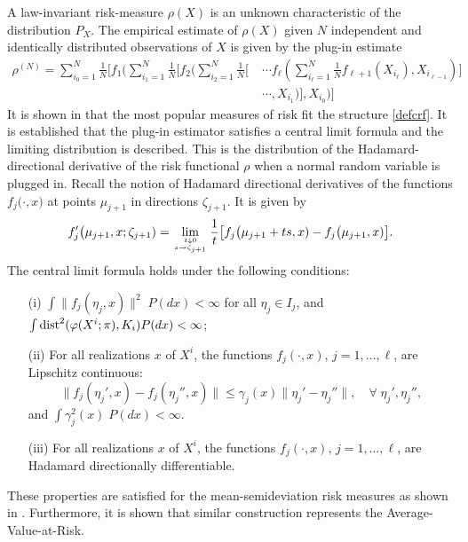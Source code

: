 \documentclass[10pt,letterpaper]{article}
\newcommand{\1}{1{\hskip -2.55 pt}\hbox{I}}
\newcommand{\dist}{\mathop{\rm dist}}
\begin{document}
A law-invariant risk-measure $\rho(X)$ is an unknown characteristic of the distribution $P_{X}$. The empirical estimate of $\rho(X)$ given $N$ independent and identically distributed observations of $X$ is given by the plug-in estimate
\begin{equation}\label{defcrfa} 
 \begin{aligned}
\rho^{(N)} = \sum_{i_0=1}^N\frac{1}{N}\Big[f_1\Big(\sum_{i_1=1}^N\frac{1}{N}\big[f_2\big(\sum_{i_2=1}^N\frac{1}{N}[&\;\cdots f_\ell(\sum_{i_\ell=1}^N\frac{1}{N}f_{\ell+1}(X_{i_\ell}),X_{i_{\ell-1}})]\\
&\;\cdots,X_{i_1}\big)\big],X_{i_0}\Big)\Big]
\end{aligned}
\end{equation}
 It is shown in \cite{dentcheva2016statistical} that the most popular measures of risk fit the structure \eqref{defcrf}. It is established that the plug-in estimator satisfies a central limit formula and the limiting distribution is described. This is the distribution of the Hadamard-directional derivative of the risk functional 
 $\rho$ when a normal random variable is plugged in. 
Recall the notion of Hadamard directional derivatives of the functions $f_{j}\big(\cdot,x)$ at points $\mu_{j+1}$ in directions
$\zeta_{j+1}$. It is given by 
\[
f'_{j}\big(\mu_{j+1},x;\zeta_{j+1}) = \lim_{{t\downarrow 0}\atop{s\to \zeta_{j+1}}}\frac{1}{t}
\big[ f_{j}\big(\mu_{j+1}+ts,x) - f_{j}\big(\mu_{j+1},x)\big].
\]
The central limit formula holds under the following conditions:
\begin{itemize}
\item[(i)]  $\int \| f_j(\eta_j,x)\|^2 \;P(dx)<\infty$ for all $\eta_j\in I_j$, and $\int \dist^2(\varphi(X^i;\pi),{K_i}) P(dx)<\infty$;
\item[(ii)]  For all realizations $x$ of $X^i$, the functions $f_j(\cdot,x)$, $j=1,\dots,\ell$, are Lipschitz continuous:
\[
\|f_j(\eta_j',x)- f_j(\eta_j'',x)\| \le \gamma_j(x) \|\eta_j'-\eta_j''\|,\quad \forall\; \eta_j',\eta_j'',
\]
and $\int \gamma_j^2(x)\;P(dx) <\infty$.
\item[(iii)]  For all realizations $x$ of $X^i$, the functions $f_j(\cdot,x)$, $j=1,\dots,\ell$, are Hadamard directionally differentiable.
\end{itemize}

These properties are satisfied for the mean-semideviation risk measures as shown in \cite{dentcheva2016statistical}. Furthermore, it is shown that similar construction represents the Average-Value-at-Risk. 
\end{document}
